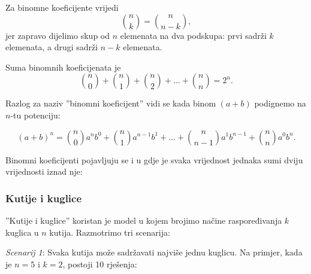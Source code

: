 Za binomne koeficijente vrijedi
\[
{n \choose k}  =  {n \choose n-k},
\]
jer zapravo dijelimo skup od $n$ elemenata na
dva podskupa: prvi sadrži $k$ elemenata,
a drugi sadrži $n-k$ elemenata.

Suma binomnih koeficijenata je
\[
{n \choose 0}+{n \choose 1}+{n \choose 2}+\ldots+{n \choose n}=2^n.
\]

Razlog za naziv ''binomni koeficijent''
vidi se kada binom $(a+b)$ podignemo na
$n$-tu potenciju:

\[ (a+b)^n =
{n \choose 0} a^n b^0 + 
{n \choose 1} a^{n-1} b^1 +
\ldots + 
{n \choose n-1} a^1 b^{n-1} +
{n \choose n} a^0 b^n. \]


Binomni koeficijenti pojavljuju se i u
gdje je svaka vrijednost jednaka sumi dviju
vrijednosti iznad nje:
\begin{center}
\end{center}

\subsubsection{Kutije i kuglice}

''Kutije i kuglice'' koristan je model
u kojem brojimo načine
raspoređivanja $k$ kuglica u $n$ kutija.
Razmotrimo tri scenarija:

\textit{Scenarij 1}: Svaka kutija može sadržavati
najviše jednu kuglicu.
Na primjer, kada je $n=5$ i $k=2$,
postoji 10 rješenja:

\begin{center}
\end{center}

